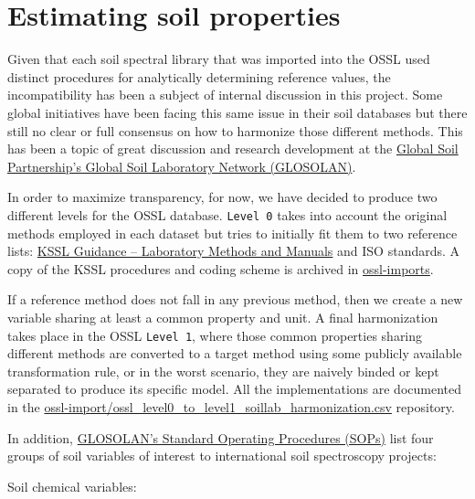 \documentclass[
  letterpaper,
  DIV=11,
  numbers=noendperiod]{scrreprt}
\begin{document}
\section{Estimating soil properties}\label{estimating-soil-properties}

Given that each soil spectral library that was imported into the OSSL
used distinct procedures for analytically determining reference values,
the incompatibility has been a subject of internal discussion in this
project. Some global initiatives have been facing this same issue in
their soil databases but there still no clear or full consensus on how
to harmonize those different methods. This has been a topic of great
discussion and research development at the
\href{https://www.fao.org/global-soil-partnership/glosolan/en/}{Global
Soil Partnership's Global Soil Laboratory Network (GLOSOLAN)}.

In order to maximize transparency, for now, we have decided to produce
two different levels for the OSSL database. \texttt{Level\ 0} takes into
account the original methods employed in each dataset but tries to
initially fit them to two reference lists:
\href{https://www.nrcs.usda.gov/resources/guides-and-instructions/kssl-guidance}{KSSL
Guidance -- Laboratory Methods and Manuals} and ISO standards. A copy of
the KSSL procedures and coding scheme is archived in
\href{https://github.com/soilspectroscopy/ossl-imports/blob/main/out/kssl_procedures.csv}{ossl-imports}.

If a reference method does not fall in any previous method, then we
create a new variable sharing at least a common property and unit. A
final harmonization takes place in the OSSL \texttt{Level\ 1}, where
those common properties sharing different methods are converted to a
target method using some publicly available transformation rule, or in
the worst scenario, they are naively binded or kept separated to produce
its specific model. All the implementations are documented in the
\href{https://github.com/soilspectroscopy/ossl-imports/blob/main/out/ossl_level0_to_level1_soillab_harmonization.csv}{ossl-import/ossl\_level0\_to\_level1\_soillab\_harmonization.csv}
repository.

In addition,
\href{http://www.fao.org/global-soil-partnership/glosolan/soil-analysis}{GLOSOLAN's
Standard Operating Procedures (SOPs)} list four groups of soil variables
of interest to international soil spectroscopy projects:

Soil chemical variables:
\end{document}
